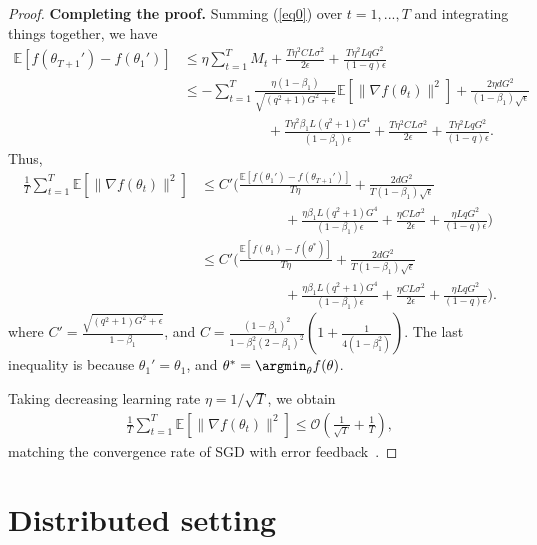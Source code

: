 \documentclass[11pt]{article}
\begin{document}
\begin{proof}
\textbf{Completing the proof.} Summing (\ref{eq0}) over $t=1,...,T$ and integrating things together, we have
\begin{align*}
    \mathbb E[f(\theta_{T+1}')-f(\theta_1')]&\leq \eta \sum_{t=1}^T M_t+\frac{T\eta^2CL\sigma^2}{2\epsilon}+\frac{T\eta^2 LqG^2}{(1-q)\epsilon}\\
    &\leq -\sum_{t=1}^T \frac{\eta(1-\beta_1)}{\sqrt{(q^2+1)G^2+\epsilon}}\mathbb E[\|\nabla f(\theta_t)\|^2]+\frac{2\eta dG^2}{(1-\beta_1)\sqrt\epsilon}\\
    &\hspace{1in}+ \frac{T \eta^2\beta_1 L(q^2+1)G^4}{(1-\beta_1)\epsilon} +\frac{T\eta^2CL\sigma^2}{2\epsilon}+\frac{T\eta^2 LqG^2}{(1-q)\epsilon}.
\end{align*}
Thus,
\begin{align*}
    \frac{1}{T}\sum_{t=1}^T \mathbb E[\|\nabla f(\theta_t)\|^2]&\leq C'\Big(\frac{\mathbb E[f(\theta_1')-f(\theta_{T+1}')]}{T\eta}+\frac{2dG^2}{T(1-\beta_1)\sqrt\epsilon}\\
    &\hspace{1in} + \frac{\eta\beta_1 L(q^2+1)G^4}{(1-\beta_1)\epsilon} +\frac{\eta CL\sigma^2}{2\epsilon}+\frac{\eta LqG^2}{(1-q)\epsilon} \Big)\\
    &\leq C'\Big(\frac{\mathbb E[f(\theta_1)-f(\theta^*)]}{T\eta}+\frac{2dG^2}{T(1-\beta_1)\sqrt\epsilon}\\
    &\hspace{1in} + \frac{\eta\beta_1 L(q^2+1)G^4}{(1-\beta_1)\epsilon} +\frac{\eta CL\sigma^2}{2\epsilon}+\frac{\eta LqG^2}{(1-q)\epsilon} \Big).
\end{align*}
where $C'=\frac{\sqrt{(q^2+1)G^2+\epsilon}}{1-\beta_1}$, and $C=\frac{(1-\beta_1)^2}{1-\beta_1^2(2-\beta_1)^2}(1+\frac{1}{4(1-\beta_1^2)})$. The last inequality is because $\theta_1'=\theta_1$, and $\theta^*=\argmin_\theta f(\theta)$.

Taking decreasing learning rate $\eta=1/\sqrt T$, we obtain
\begin{align*}
    \frac{1}{T}\sum_{t=1}^T \mathbb E[\|\nabla f(\theta_t)\|^2]\leq \mathcal O(\frac{1}{\sqrt T}+\frac{1}{T}),
\end{align*}
matching the convergence rate of SGD with error feedback~\cite{karimireddy2019error}.

\end{proof}


\section{Distributed setting}
\end{document}
